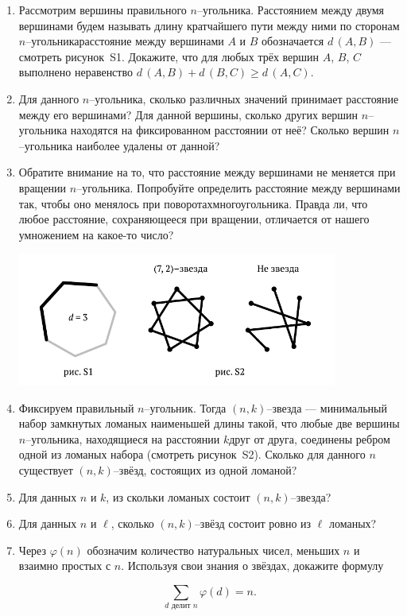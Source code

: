 ﻿
\begin{enumerate}

\item Рассмотрим вершины правильного $n$--угольника. Расстоянием между двумя вершинами будем называть длину кратчайшего пути между ними по сторонам $n$--угольника\scolon расстояние между вершинами $A$ и $B$ обозначается $d\,(A,B)$ — смотреть рисунок~S1. Докажите, что для любых трёх вершин $A$, $B$, $C$ выполнено неравенство $d\,(A,B) + d\,(B,C) \geq d\,(A,C)$.

\item Для данного $n$--угольника, сколько различных значений принимает расстояние между его вершинами? Для данной вершины, сколько других вершин $n$--угольника находятся на фиксированном расстоянии от неё? Сколько вершин $n$--угольника наиболее удалены от данной?

\item Обратите внимание на то, что расстояние между вершинами не меняется при вращении $n$--угольника. Попробуйте определить расстояние между вершинами так, чтобы оно менялось при поворотах\linebreak многоугольника. Правда ли, что любое расстояние, сохраняющееся при вращении, отличается от нашего умножением на какое-то число?


\vspace{-0.6cm}
\begin{center}
\includegraphics[width=10.5cm]{stats/2017/images/star_defs.pdf}
\end{center} \vspace{-0.7cm}

\item Фиксируем правильный $n$--угольник. Тогда $(n,k)$--звезда — минимальный набор замкнутых ломаных наименьшей длины такой, что любые две вершины $n$--угольника, находящиеся на расстоянии $k$\linebreak друг от друга, соединены ребром одной из ломаных набора (смотреть рисунок~S2). Сколько для данного $n$ существует $(n,k)$--звёзд, состоящих из одной ломаной?

\item Для данных $n$ и $k$, из скольки ломаных состоит $(n,k)$--звезда?

\item Для данных $n$ и $\ell$, сколько $(n,k)$--звёзд состоит ровно из $\ell$ ломаных?

\item Через $\varphi(n)$ обозначим количество натуральных чисел, меньших $n$ и взаимно простых с $n$. Используя свои знания о звёздах, докажите формулу

$$\sum\limits_{d \text{ делит } n}\!\!\!\!\!\varphi(d) = n.$$
\end{enumerate}
